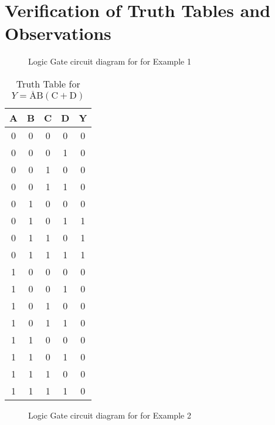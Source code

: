 \documentclass{scrartcl}
\begin{document}
\section{Verification of Truth Tables and Observations}
\begin{figure}[H]
    \centering
    
    \caption{Logic Gate circuit diagram for for Example 1}
\end{figure}
\begin{table}[H]
    \centering
    \caption{Truth Table for \( Y = \overline{\mathrm{A}}\mathrm{B}(\mathrm{C + D}) \)}
    \vspace{0.2cm}
    \begin{tabular}{|c|c|c|c||c|}
    \hline
    \textbf{A} & \textbf{B} & \textbf{C} & \textbf{D} & \textbf{Y} \\
    \hline
    0 & 0 & 0 & 0 & 0 \\
    0 & 0 & 0 & 1 & 0 \\
    0 & 0 & 1 & 0 & 0 \\
    0 & 0 & 1 & 1 & 0 \\
    0 & 1 & 0 & 0 & 0 \\
    0 & 1 & 0 & 1 & 1 \\
    0 & 1 & 1 & 0 & 1 \\
    0 & 1 & 1 & 1 & 1 \\
    1 & 0 & 0 & 0 & 0 \\
    1 & 0 & 0 & 1 & 0 \\
    1 & 0 & 1 & 0 & 0 \\
    1 & 0 & 1 & 1 & 0 \\
    1 & 1 & 0 & 0 & 0 \\
    1 & 1 & 0 & 1 & 0 \\
    1 & 1 & 1 & 0 & 0 \\
    1 & 1 & 1 & 1 & 0 \\
    \hline
    \end{tabular}
    \end{table}
\begin{figure}[H]
    \centering
    
    \caption{Logic Gate circuit diagram for for Example 2}

\end{figure}
\end{document}
